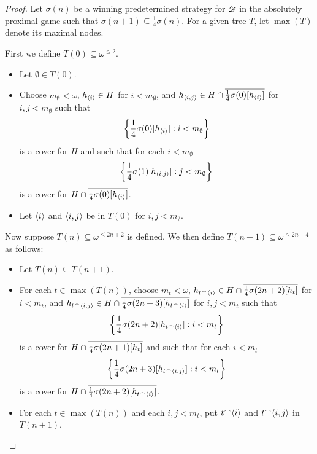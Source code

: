 \begin{proof}
  Let $\sigma(n)$ be a winning predetermined strategy for $\mathscr{D}$ in the 
  absolutely proximal game such that 
  $\sigma(n+1)\subseteq \frac{1}{4}\sigma(n)$.
  For a given tree $T$, let $\max(T)$ denote its maximal nodes.

  \bigskip

  First we define $T(0)\subseteq \omega^{\leq 2}$.

  \begin{itemize}
    \item Let $\emptyset\in T(0)$.
    \item Choose 
      $m_{\emptyset}<\omega$, 
      $h_{\langle i\rangle}\in H$ for $i<m_{\emptyset}$, and 
      $h_{\langle i,j\rangle}\in 
        H\cap\overline{\frac{1}{4}\sigma(0)[h_{\langle i\rangle}]}$ 
      for $i,j<m_{\emptyset}$ such that
        \[
          \left\{\frac{1}{4}\sigma(0)[h_{\langle i\rangle}]:i<m_{\emptyset}\right\}
        \]
      is a cover for $H$ and such that for each $i<m_{\emptyset}$
        \[
          \left\{\frac{1}{4}\sigma(1)[h_{\langle i,j\rangle}]:j<m_{\emptyset}\right\}
        \]
      is a cover for 
      $H\cap\overline{\frac{1}{4}\sigma(0)[h_{\langle i\rangle}]}$.
    \item Let $\langle i\rangle$ and $\langle i,j\rangle$ be in $T(0)$ for $i,j<m_{\emptyset}$.
  \end{itemize}

  \bigskip

  Now suppose $T(n)\subseteq \omega^{\leq 2n+2}$ is defined. 
  We then define $T(n+1)\subseteq \omega^{\leq 2n+4}$ as follows:

  \begin{itemize}
    \item Let $T(n)\subseteq T(n+1)$.
    \item For each $t\in\max(T(n))$, choose 
        $m_t<\omega$, 
        $h_{t^\frown\langle i\rangle}\in H\cap \overline{\frac{1}{4}\sigma(2n+2)[h_t]}$ 
          for $i<m_t$, 
        and 
          $
            h_{t^\frown\langle i,j\rangle} 
              \in 
            H\cap\overline{\frac{1}{4}\sigma(2n+3)[h_{t^\frown\langle i\rangle}]}
          $ 
        for $i,j<m_t$ such that
      \[
        \left\{\frac{1}{4}\sigma(2n+2)[h_{t^\frown\langle i\rangle}]:i<m_t\right\}
      \]
    is a cover for $H\cap \overline{\frac{1}{4}\sigma(2n+1)[h_t]}$ 
    and such that for each $i<m_t$
      \[
        \left\{\frac{1}{4}\sigma(2n+3)[h_{t^\frown\langle i,j\rangle}]:i<m_t\right\}
      \]
    is a cover for $H\cap\overline{\frac{1}{4}\sigma(2n+2)[h_{t^\frown\langle i\rangle}]}$.
    \item For each $t\in\max(T(n))$ and each $i,j<m_t$, put $t^\frown\langle i\rangle$
      and $t^\frown\langle i,j\rangle$ in $T(n+1)$.
  \end{itemize}


\end{proof}
